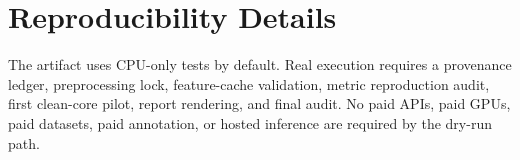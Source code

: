\section{Reproducibility Details}

The artifact uses CPU-only tests by default. Real execution requires a provenance ledger, preprocessing lock, feature-cache validation, metric reproduction audit, first clean-core pilot, report rendering, and final audit. No paid APIs, paid GPUs, paid datasets, paid annotation, or hosted inference are required by the dry-run path.
